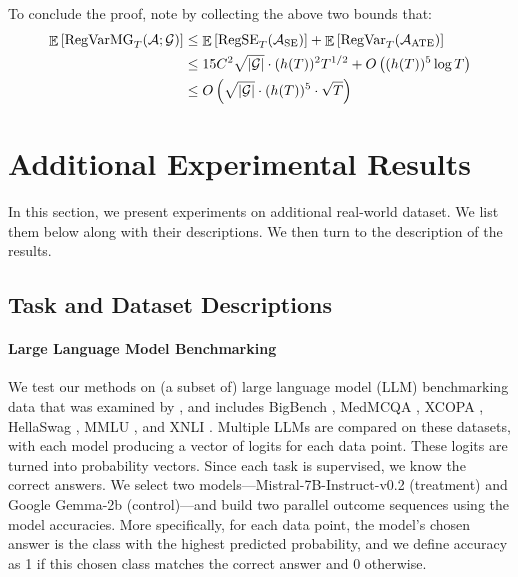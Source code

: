     To conclude the proof, note by collecting the above two bounds that:
    \begin{align*}
        \mathop{\mathbb{E}} \left[\mathrm{RegVarMG}_T(\mathcal{A}; \mathcal{G}) \right] &\leq \mathop{\mathbb{E}} \left[\mathrm{RegSE}_T(\mathcal{A}_\mathrm{SE}) \right] + \mathop{\mathbb{E}} \left[\mathrm{RegVar}_T(\mathcal{A}_\mathrm{ATE}) \right] \\
        &\leq 15 C^2 \sqrt{|\mathcal{G}|} \cdot (h(T))^2 T^{1/2} + O \left( (h(T))^5 \log T \right) \\
        &\leq O \left( \sqrt{|\mathcal{G}|} \cdot (h(T))^5 \cdot \sqrt{T} \right)
    \end{align*}



\section{Additional Experimental Results} \label{app:datasets}

In this section, we present experiments on additional real-world dataset. We list them below along with their descriptions.
We then turn to the description of the results.

\subsection{Task and Dataset Descriptions}

\paragraph{Large Language Model Benchmarking}
We test our methods on (a subset of) large language model (LLM) benchmarking data that was examined by \citet{fogliato2024precise}, and includes BigBench \citep{srivastava2022beyond}, MedMCQA \citep{pal2022medmcqa}, XCOPA \citep{ponti2020xcopa}, HellaSwag \citep{zellers2019hellaswag}, MMLU \citep{hoffmann2022training}, and XNLI \citep{conneau2018xnli}. Multiple LLMs are compared on these datasets, with each model producing a vector of logits for each data point. These logits are turned into probability vectors. Since each task is supervised, we know the correct answers. We select two models—Mistral-7B-Instruct-v0.2 \citep{jiang2023mistral} (treatment) and Google Gemma-2b \citep{team2024gemma} (control)—and build two parallel outcome sequences using the model accuracies. More specifically, for each data point, the model's chosen answer is the class with the highest predicted probability, and we define accuracy as 1 if this chosen class matches the correct answer and 0 otherwise.


